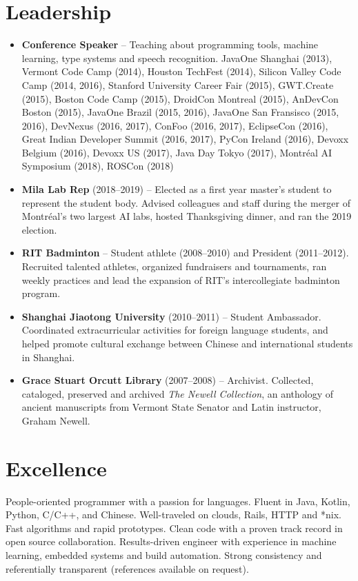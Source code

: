\documentclass[letterpaper,11pt]{article}
\newcommand{\resumeItem}[2]{
\item\small{
\textbf{#1}{ #2 \vspace{-2pt}}
}
}
\newcommand{\resumeSubItem}[2]{\resumeItem{#1}{#2}\vspace{-4pt}}
\newcommand{\resumeSubHeadingListStart}{\begin{itemize}[leftmargin=*]}
\newcommand{\resumeSubHeadingListEnd}{\end{itemize}}
\begin{document}
\begin{justify}
\section{Leadership}
\resumeSubHeadingListStart
\resumeSubItem{Conference Speaker} {-- Teaching about programming tools, machine learning, type systems and speech recognition. JavaOne Shanghai (2013), Vermont Code Camp (2014), Houston TechFest (2014), Silicon Valley Code Camp (2014, 2016), Stanford University Career Fair (2015), GWT.Create (2015), Boston Code Camp (2015), DroidCon Montreal (2015), AnDevCon Boston (2015), JavaOne Brazil (2015, 2016), JavaOne San Fransisco (2015, 2016), DevNexus (2016, 2017), ConFoo (2016, 2017), EclipseCon (2016), Great Indian Developer Summit (2016, 2017), PyCon Ireland (2016), Devoxx Belgium (2016), Devoxx US (2017), Java Day Tokyo (2017), Montr\'eal AI Symposium (2018), ROSCon (2018)}
\resumeSubItem{Mila Lab Rep} {(2018--2019) -- Elected as a first year master's student to represent the student body. Advised colleagues and staff during the merger of Montr\'eal's two largest AI labs, hosted Thanksgiving dinner, and ran the 2019 election.}
\resumeSubItem{RIT Badminton} {-- Student athlete (2008--2010) and President (2011--2012). Recruited talented athletes, organized fundraisers and tournaments, ran weekly practices and lead the expansion of RIT's intercollegiate badminton program.}
\resumeSubItem{Shanghai Jiaotong University} {(2010--2011) -- Student Ambassador. Coordinated extracurricular activities for foreign language students, and helped promote cultural exchange between Chinese and international students in Shanghai.}
\resumeSubItem{Grace Stuart Orcutt Library} {(2007--2008) -- Archivist. Collected, cataloged, preserved and archived \textit{The Newell Collection}, an anthology of ancient manuscripts from Vermont State Senator and Latin instructor, Graham Newell.}
\resumeSubHeadingListEnd

\section{Excellence}
People-oriented programmer with a passion for languages. Fluent in Java, Kotlin, Python, C/C++, and Chinese. Well-traveled on clouds, Rails, HTTP and *nix. Fast algorithms and rapid prototypes. Clean code with a proven track record in open source collaboration. Results-driven engineer with experience in machine learning, embedded systems and build automation. Strong consistency and referentially transparent (references available on request).
\end{justify}
\end{document}
